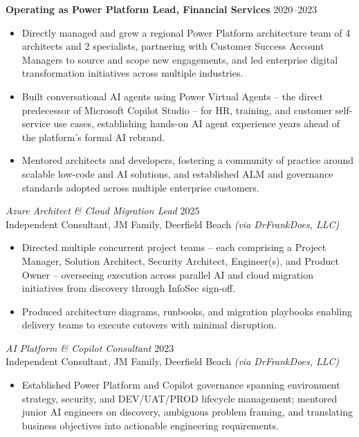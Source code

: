 \documentclass[margin]{res}
\begin{document}
\begin{resume}
\textbf{Operating as Power Platform Lead, Financial Services} \hfill 2020--2023\\
\begin{itemize}
\item Directly managed and grew a regional Power Platform architecture team of 4 architects and 2 specialists, partnering with Customer Success Account Managers to source and scope new engagements, and led enterprise digital transformation initiatives across multiple industries.
\item Built conversational AI agents using Power Virtual Agents -- the direct predecessor of Microsoft Copilot Studio -- for HR, training, and customer self-service use cases, establishing hands-on AI agent experience years ahead of the platform's formal AI rebrand.
\item Mentored architects and developers, fostering a community of practice around scalable low-code and AI solutions, and established ALM and governance standards adopted across multiple enterprise customers.
\end{itemize}

{\sl Azure Architect \& Cloud Migration Lead} \hfill 2025\\
Independent Consultant, JM Family, Deerfield Beach \emph{(via DrFrankDoes, LLC)}
\begin{itemize}
\item Directed multiple concurrent project teams -- each comprising a Project Manager, Solution Architect, Security Architect, Engineer(s), and Product Owner -- overseeing execution across parallel AI and cloud migration initiatives from discovery through InfoSec sign-off.
\item Produced architecture diagrams, runbooks, and migration playbooks enabling delivery teams to execute cutovers with minimal disruption.
\end{itemize}

{\sl AI Platform \& Copilot Consultant} \hfill 2023\\
Independent Consultant, JM Family, Deerfield Beach \emph{(via DrFrankDoes, LLC)}
\begin{itemize}
\item Established Power Platform and Copilot governance spanning environment strategy, security, and DEV/UAT/PROD lifecycle management; mentored junior AI engineers on discovery, ambiguous problem framing, and translating business objectives into actionable engineering requirements.
\end{itemize}


\end{resume}
\end{document}
